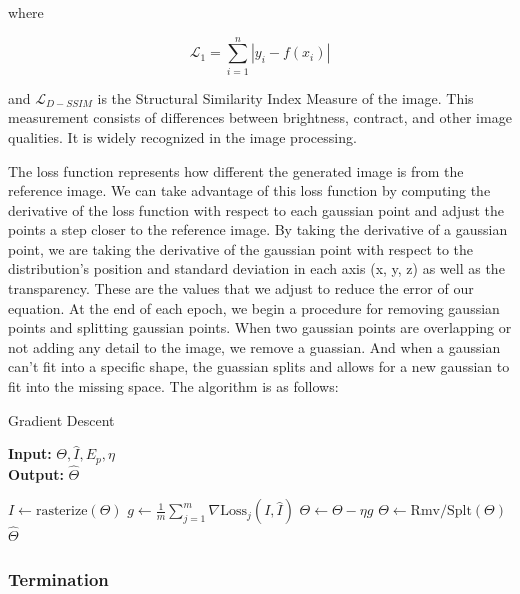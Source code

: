 \documentclass[12pt, a4paper, twocolumn]{article}
\begin{document}
where 

\begin{equation}
    \mathcal{L}_1 = \sum_{i=1}^{n} |y_i - f(x_i)|
\end{equation}

and $\mathcal{L}_{D-SSIM}$ is the Structural Similarity Index Measure of the image. This measurement consists of differences between brightness, contract, and other image qualities. It is widely recognized in the image processing.

The loss function represents how different the generated image is from the reference image. We can take advantage of this loss function by computing the derivative of the loss function with respect to each gaussian point and adjust the points a step closer to the reference image. By taking the derivative of a gaussian point, we are taking the derivative of the gaussian point with respect to the distribution's position and standard deviation in each axis (x, y, z) as well as the transparency. These are the values that we adjust to reduce the error of our equation. At the end of each epoch, we begin a procedure for removing gaussian points and splitting gaussian points. When two gaussian points are overlapping or not adding any detail to the image, we remove a guassian. And when a gaussian can't fit into a specific shape, the guassian splits and allows for a new gaussian to fit into the missing space. The algorithm is as follows:

\begin{algorithm}
\caption{Gradient Descent}
\hspace*{\algorithmicindent} \textbf{Input:} $\Theta, \hat{I}, E_p, \eta$\\
\hspace*{\algorithmicindent} \textbf{Output:} $\hat{\Theta}$
\begin{algorithmic}[1]

        \State $I \leftarrow \text{rasterize}(\Theta)$
        \State $g \leftarrow \frac{1}{m} \sum_{j=1}^{m} \nabla \text{Loss}_j(I, \hat{I})$
        \State $\Theta \leftarrow \Theta - \eta g$
        \State $\Theta \leftarrow \text{Rmv/Splt}(\Theta)$
    \EndFor
    \State \Return $\hat{\Theta}$
\EndProcedure
\end{algorithmic}
\end{algorithm}

\subsubsection{Termination}
\end{document}
